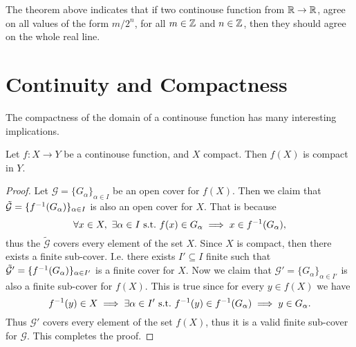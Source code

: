 \begin{remark}
	The theorem above indicates that if two continouse function from $\mathbb{R} \to \mathbb{R}$, agree on all values of the form $m/2^n$, for all $m\in\mathbb{Z}$ and $n\in \mathbb{Z}$, then they should agree on the whole real line.
\end{remark}

\section{Continuity and Compactness}
The compactness of the domain of a continouse function has many interesting implications.

\begin{theorem}
	Let $f:X\to Y$ be a continouse function, and $X$ compact. Then $f(X)$ is compact in $Y$.
\end{theorem}
\begin{proof}
	Let $\mathcal{G} = \{G_\alpha\}_{\alpha\in I}$ be an open cover for $f(X)$. Then we claim that $\tilde{\mathcal{G}} = \{ f^{-1}(G_\alpha) \}_{\alpha \in I}$ is also an open cover for $X$. That is because
	\[ \forall x \in X,\ \exists \alpha \in I \ \text{s.t.}\  f(x) \in G_\alpha \implies x \in f^{-1}(G_\alpha),\]
	thus the $\tilde{\mathcal{G}}$ covers every element of the set $X$. Since $X$ is compact, then there exists a finite sub-cover. I.e. there exists $I' \subseteq I$ finite such that $\tilde{\mathcal{G}}' = \{  f^{-1}(G_\alpha)  \}_{\alpha \in I'}$ is a finite cover for $X$. Now we claim that $\mathcal{G}' = \{  G_\alpha \}_{\alpha \in I'}$ is also a finite sub-cover for $f(X)$. This is true since for every $y \in f(X)$ we have
	\[ f^{-1}(y) \in X \implies \exists \alpha \in I' \ \text{s.t.}\  f^{-1}(y) \in f^{-1}(G_\alpha) \implies y \in G_\alpha. \]
	Thus $\mathcal{G}'$ covers every element of the set $f(X)$, thus it is a valid finite sub-cover for $\mathcal{G}$. This completes the proof.
\end{proof}